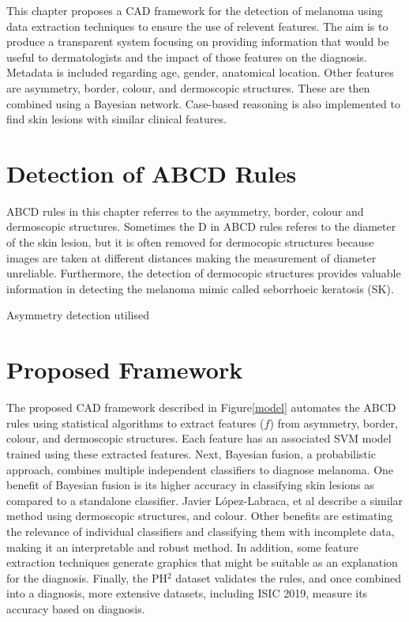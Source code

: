 This chapter proposes a CAD framework for the detection of melanoma using data extraction techniques to ensure the use of relevent features. The aim is to produce a transparent system focusing on providing information that would be useful to dermatologists and the impact of those features on the diagnosis. Metadata is included regarding age, gender, anatomical location. Other features are asymmetry, border, colour, and dermoscopic structures. These are then combined using a Bayesian network. Case-based reasoning is also implemented to find skin lesions with similar clinical features.

\section{Detection of ABCD Rules}
ABCD rules in this chapter referres to the asymmetry, border, colour and dermoscopic structures. Sometimes the D in ABCD rules referes to the diameter of the skin lesion, but it is often removed for dermocopic structures because images are taken at different distances making the measurement of diameter unreliable. Furthermore, the detection of dermocopic structures provides valuable information in detecting the melanoma mimic called seborrhoeic keratosis (SK)\cite{Minagawa2017}. 

Asymmetry detection utilised 


\section{Proposed Framework}
The proposed CAD framework described in Figure\ref{model} automates the ABCD rules using statistical algorithms to extract features ($f$) from asymmetry, border, colour, and dermoscopic structures. Each feature has an associated SVM model trained using these extracted features. Next, Bayesian fusion, a probabilistic approach, combines multiple independent classifiers to diagnose melanoma. One benefit of Bayesian fusion is its higher accuracy in classifying skin lesions as compared to a standalone classifier\cite{Takruri2017}.  Javier López-Labraca, et al describe a similar method using dermoscopic structures, and colour\cite{Lopez-Labraca2018}. Other benefits are estimating the relevance of individual classifiers and classifying them with incomplete data, making it an interpretable and robust method. In addition, some feature extraction techniques generate graphics that might be suitable as an explanation for the diagnosis. Finally, the PH$^2$ dataset validates the rules, and once combined into a diagnosis, more extensive datasets, including ISIC 2019, measure its accuracy based on diagnosis.

